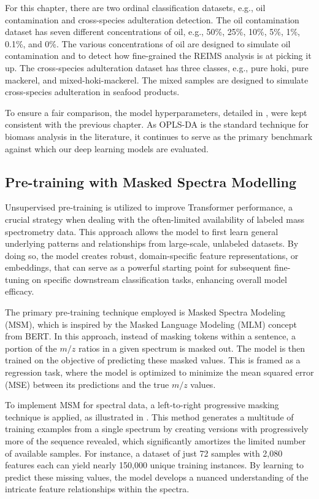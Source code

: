 For this chapter, there are two ordinal classification datasets, e.g., oil contamination and cross-species adulteration detection. The oil contamination dataset has seven different concentrations of oil, e.g., 50\%, 25\%, 10\%, 5\%, 1\%, 0.1\%, and 0\%. The various concentrations of oil are designed to simulate oil contamination and to detect how fine-grained the REIMS analysis is at picking it up. The cross-species adulteration dataset has three classes, e.g., pure hoki, pure mackerel, and mixed-hoki-mackerel. The mixed samples are designed to simulate cross-species adulteration in seafood products.

To ensure a fair comparison, the model hyperparameters, detailed in , were kept consistent with the previous chapter.
As OPLS-DA \citep{Bylesjoe2006} is the standard technique for biomass analysis in the literature, it continues to serve as the primary benchmark against which our deep learning models are evaluated.

\subsection{Pre-training with Masked Spectra Modelling}

Unsupervised pre-training is utilized to improve Transformer performance, a crucial strategy when dealing with the often-limited availability of labeled mass spectrometry data. This approach allows the model to first learn general underlying patterns and relationships from large-scale, unlabeled datasets. By doing so, the model creates robust, domain-specific feature representations, or embeddings, that can serve as a powerful starting point for subsequent fine-tuning on specific downstream classification tasks, enhancing overall model efficacy.

The primary pre-training technique employed is Masked Spectra Modeling (MSM), which is inspired by the Masked Language Modeling (MLM) concept from BERT. In this approach, instead of masking tokens within a sentence, a portion of the $m/z$ ratios in a given spectrum is masked out. The model is then trained on the objective of predicting these masked values. This is framed as a regression task, where the model is optimized to minimize the mean squared error (MSE) between its predictions and the true $m/z$ values.

To implement MSM for spectral data, a left-to-right progressive masking technique is applied, as illustrated in . This method generates a multitude of training examples from a single spectrum by creating versions with progressively more of the sequence revealed, which significantly amortizes the limited number of available samples. For instance, a dataset of just 72 samples with 2,080 features each can yield nearly 150,000 unique training instances. By learning to predict these missing values, the model develops a nuanced understanding of the intricate feature relationships within the spectra.

